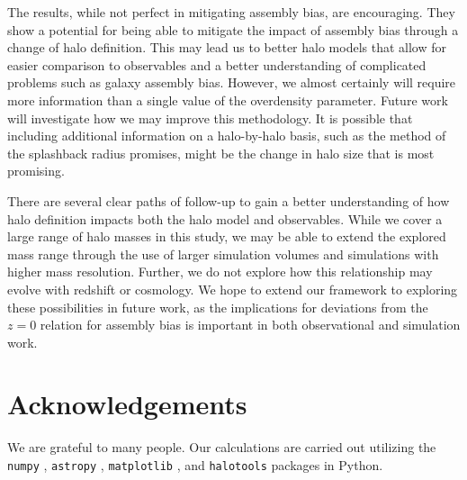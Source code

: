 \documentclass[usenatbib,fleqn]{mnras}
\begin{document}
The results, while not perfect in mitigating assembly bias, are encouraging. They show a potential for being able to mitigate the impact of assembly bias through a change of halo definition. This may lead us to better halo models that allow for easier comparison to observables and a better understanding of complicated problems such as galaxy assembly bias. However, we almost certainly will require more information than a single value of the overdensity parameter. Future work will investigate how we may improve this methodology. It is possible that including additional information on a halo-by-halo basis, such as the method of the splashback radius promises, might be the change in halo size that is most promising.

There are several clear paths of follow-up to gain a better understanding of how halo definition impacts both the halo model and observables. While we cover a large range of halo masses in this study, we may be able to extend the explored mass range through the use of larger simulation volumes and simulations with higher mass resolution. Further, we do not explore how this relationship may evolve with redshift or cosmology. We hope to extend our framework to exploring these possibilities in future work, as the implications for deviations from the $z=0$ relation for assembly bias is important in both observational and simulation work.

\section*{Acknowledgements}

We are grateful to many people. Our calculations are carried out utilizing the
{\tt numpy} \citep{numpy}, {\tt astropy} \citep{astropy}, {\tt matplotlib} 
\citep{matplotlib}, and {\tt halotools} \citep{halotools} packages in Python.




\label{lastpage}
\end{document}

